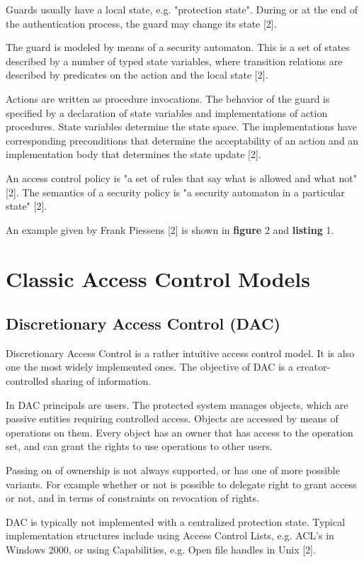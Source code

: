 Guards usually have a local state, e.g. "protection state". During or at the end of the authentication process, the guard may change its state [2].

The guard is modeled by means of a security automaton. This is a set of states described by a number of typed state variables, where transition relations are described by predicates on the action and the local state [2].

Actions are written as procedure invocations. The behavior of the guard is specified by a declaration of state variables and implementations of action procedures. State variables determine the state space. The implementations have corresponding preconditions that determine the acceptability of an action and an implementation body that determines the state update [2].

An access control policy is "a set of rules that say what is allowed and what not" [2]. The semantics of a security policy is "a security automaton in a particular state" [2].

An example given by Frank Piessens [2] is shown in \textbf{figure} 2 and \textbf{listing} 1.


\section{Classic Access Control Models}

\subsection{Discretionary Access Control (DAC)}

Discretionary Access Control is a rather intuitive access control model. It is also one the most widely implemented ones. The objective of DAC is a creator-controlled sharing of information.

In DAC principals are users. The protected system manages objects, which are passive entities requiring controlled access. Objects are accessed by means of operations on them. Every object has an owner that has access to the operation set, and can grant the rights to use operations to other users.

Passing on of ownership is not always supported, or has one of more possible variants. For example whether or not is possible to delegate right to grant access or not, and in terms of constraints on revocation of rights.

DAC is typically not implemented with a centralized protection state. Typical implementation structures include using Access Control Lists, e.g. ACL's in Windows 2000, or using Capabilities, e.g. Open file handles in Unix [2].


